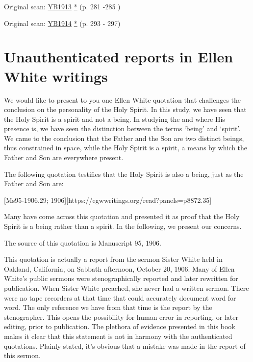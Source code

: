
Original scan: \href{https://documents.adventistarchives.org/Yearbooks/YB1913.pdf#search=Yearbook%201913}{YB1913} \href{https://forgotten-pillar.s3.us-east-2.amazonaws.com/YB1913.pdf}{*} (p. 281 -285 )

Original scan: \href{https://documents.adventistarchives.org/Yearbooks/YB1914.pdf#search=Yearbook%201914}{YB1914} \href{https://forgotten-pillar.s3.us-east-2.amazonaws.com/YB1914.pdf}{*} (p. 293 - 297)

\section*{Unauthenticated reports in Ellen White writings}

\label{appendix:unauthenticated-reports}
We would like to present to you one Ellen White quotation that challenges the conclusion on the personality of the Holy Spirit. In this study, we have seen that the Holy Spirit is a spirit and not a being. In studying the  and where His presence is, we have seen the distinction between the terms ‘being’ and ‘spirit’. We came to the conclusion that the Father and the Son are two distinct beings, thus constrained in space, while the Holy Spirit is a spirit, a means by which the Father and Son are everywhere present.

The following quotation testifies that the Holy Spirit is also a being, just as the Father and Son are:

[Ms95-1906.29; 1906][https://egwwritings.org/read?panels=p8872.35]

Many have come across this quotation and presented it as proof that the Holy Spirit is a being rather than a spirit. In the following, we present our concerns.

The source of this quotation is Manuscript 95, 1906. 

This quotation is actually a report from the sermon Sister White held in Oakland, California, on Sabbath afternoon, October 20, 1906. Many of Ellen White’s public sermons were stenographically reported and later rewritten for publication. When Sister White preached, she never had a written sermon. There were no tape recorders at that time that could accurately document word for word. The only reference we have from that time is the report by the stenographer. This opens the possibility for human error in reporting, or later editing, prior to publication. The plethora of evidence presented in this book makes it clear that this statement is not in harmony with the authenticated quotations. Plainly stated, it’s obvious that a mistake was made in the report of this sermon.

